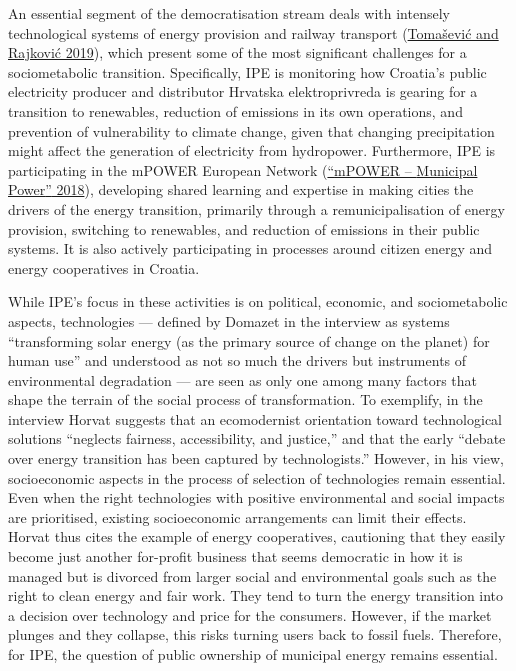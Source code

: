 \documentclass[a4paper, nobind]{templates/ociamthesis}
\begin{document}
An essential segment of the democratisation stream deals with intensely technological systems of energy provision and railway transport (\protect\hyperlink{ref-tomasevic_nase_2019}{Tomašević and Rajković 2019}), which present some of the most significant challenges for a sociometabolic transition. Specifically, IPE is monitoring how Croatia's public electricity producer and distributor Hrvatska elektroprivreda is gearing for a transition to renewables, reduction of emissions in its own operations, and prevention of vulnerability to climate change, given that changing precipitation might affect the generation of electricity from hydropower. Furthermore, IPE is participating in the mPOWER European Network (\protect\hyperlink{ref-_mpower_2018}{{``{mPOWER} -- {Municipal Power}''} 2018}), developing shared learning and expertise in making cities the drivers of the energy transition, primarily through a remunicipalisation of energy provision, switching to renewables, and reduction of emissions in their public systems. It is also actively participating in processes around citizen energy and energy cooperatives in Croatia.

While IPE's focus in these activities is on political, economic, and sociometabolic aspects, technologies --- defined by Domazet in the interview as systems ``transforming solar energy (as the primary source of change on the planet) for human use'' and understood as not so much the drivers but instruments of environmental degradation --- are seen as only one among many factors that shape the terrain of the social process of transformation. To exemplify, in the interview Horvat suggests that an ecomodernist orientation toward technological solutions ``neglects fairness, accessibility, and justice,'' and that the early ``debate over energy transition has been captured by technologists.'' However, in his view, socioeconomic aspects in the process of selection of technologies remain essential. Even when the right technologies with positive environmental and social impacts are prioritised, existing socioeconomic arrangements can limit their effects. Horvat thus cites the example of energy cooperatives, cautioning that they easily become just another for-profit business that seems democratic in how it is managed but is divorced from larger social and environmental goals such as the right to clean energy and fair work. They tend to turn the energy transition into a decision over technology and price for the consumers. However, if the market plunges and they collapse, this risks turning users back to fossil fuels. Therefore, for IPE, the question of public ownership of municipal energy remains essential.
\end{document}
